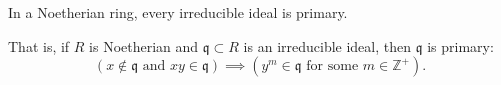 In a Noetherian ring, every irreducible ideal is primary.

That is, if $R$ is Noetherian and $\mathfrak{q} \subset R$ is an irreducible ideal, then $\mathfrak{q}$ is primary:
$$(x \notin \mathfrak{q} \text{ and } xy \in \mathfrak{q}) \implies (y^m \in \mathfrak{q} \text{ for some } m \in \mathbb{Z}^+).$$
